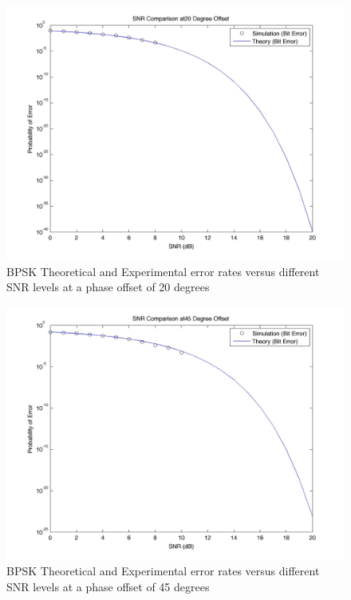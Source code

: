 \documentclass[]{article}
\begin{document}
\begin{figure}[H]
\centering
\hspace*{-2cm}\includegraphics[width=1.3\textwidth]{bpSNRpo3.jpg}
\caption{BPSK Theoretical and Experimental error rates versus different SNR levels at a phase offset of 20 degrees }
\end{figure}

\begin{figure}[H]
\centering
\hspace*{-2cm}\includegraphics[width=1.3\textwidth]{bpSNRpo4.jpg}
\caption{BPSK Theoretical and Experimental error rates versus different SNR levels at a phase offset of 45 degrees }
\end{figure}
\end{document}
